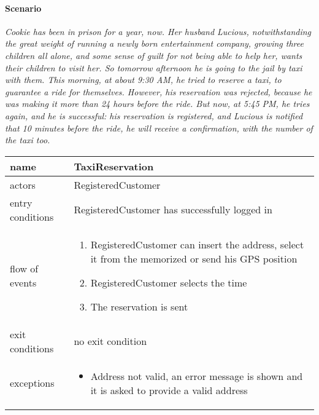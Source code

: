 \paragraph{Scenario}\begin{fullwidth}\small\itshape Cookie has been in prison for a year, now. Her husband Lucious, notwithstanding the great weight of running a newly born entertainment company, growing three children all alone, and some sense of guilt for not being able to help her, wants their children to visit her. So tomorrow afternoon he is going to the jail by taxi with them. This morning, at about 9:30 AM, he tried to reserve a taxi, to guarantee a ride for themselves. However, his reservation was rejected, because he was making it more than 24 hours before the ride. But now, at 5:45 PM, he tries again, and he is successful: his reservation is registered, and Lucious is notified that 10 minutes before the ride, he will receive a confirmation, with the number of the taxi too.\end{fullwidth}


	\begin{fullwidth}
		\begin{tabular}{ l p{} }
	\toprule
	name	&	TaxiReservation
	\\ \midrule
	actors	&	RegisteredCustomer
	\\ \midrule
	entry conditions & RegisteredCustomer has successfully logged in
	\\ \midrule
	flow of events & \begin{enumerate}
	
		\item RegisteredCustomer can insert the address, select it from the memorized or send his GPS position
		\item RegisteredCustomer selects the time
		\item The reservation is sent
	
	\end{enumerate}\\ \midrule
	exit conditions	&	 no exit condition
	\\ \midrule
	exceptions & \begin{itemize}
		
		\item Address not valid, an error message is shown and it is asked to provide a valid address
	
	\end{itemize}\\ \bottomrule
\end{tabular}
	\end{fullwidth}


